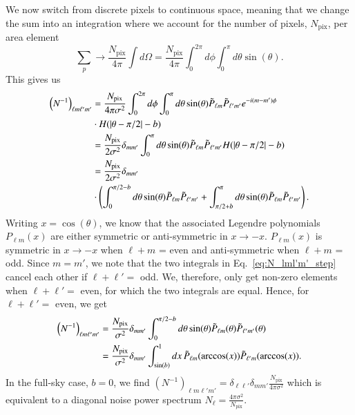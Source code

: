 \documentclass[twocolumn]{../common/aa}
\begin{document}
We now switch from discrete pixels to continuous space, meaning that we change the sum into an integration where we account for the number of pixels, $N_{\mathrm{pix}}$, per area element
\begin{equation}
\sum_p \rightarrow \frac{N_{\mathrm{pix}}}{4\pi}\int d\Omega  = \frac{N_{\mathrm{pix}}}{4\pi}\int_{0}^{2\pi} d\phi \int_{0}^{\pi} d\theta \sin(\theta).
\end{equation}
This gives us
\begin{align}
\nonumber
\left(N^{-1}\right)_{\ell m \ell' m'} &= \frac{N_{\mathrm{pix}}}{4\pi \sigma^2}\int_{0}^{2\pi} d\phi \int_{0}^{\pi} d\theta \sin(\theta)\Tilde{P}_{\ell m}  \Tilde{P}_{\ell' m'}  e^{-i(m-m')\phi}
\\
\nonumber
&\cdot H(|\theta -\pi/2|-b)\\
\nonumber
&= \frac{N_{\mathrm{pix}}}{2\sigma^2} \delta_{mm'}\int_{0}^{\pi} d\theta \sin(\theta)\Tilde{P}_{\ell m}  \Tilde{P}_{\ell' m'} H(|\theta -\pi/2|-b)\\
\nonumber
&= \frac{N_{\mathrm{pix}}}{2\sigma^2} \delta_{mm'}\\
\label{eq:N_lml'm'_step}
&\cdot \left(\int_{0}^{\pi/2-b} d\theta \sin(\theta) \Tilde{P}_{\ell m}  \Tilde{P}_{\ell' m'}+\int_{\pi/2+b}^{\pi} d\theta \sin(\theta)\Tilde{P}_{\ell m}  \Tilde{P}_{\ell' m'}\right).
\end{align}
Writing $x=\cos(\theta)$, we know that the associated Legendre polynomials $P_{\ell m}(x)$ are either symmetric or anti-symmetric in $x\rightarrow-x$. $P_{\ell m}(x)$ is symmetric in $x \rightarrow -x$ when $\ell+m$ = even and anti-symmetric when $\ell+m$ = odd. Since $m=m'$, we note that the two integrals in Eq.~\eqref{eq:N_lml'm'_step} cancel each other if $\ell+\ell' =$ odd. We, therefore, only get non-zero elements when $\ell + \ell' =$ even, for which the two integrals are equal. Hence, for $\ell + \ell'=$ even, we get
\begin{align}
\nonumber
\left(N^{-1}\right)_{\ell m \ell' m'} &= \frac{N_{\mathrm{pix}}}{\sigma^2} \delta_{mm'}\int_{0}^{\pi/2-b} d\theta \sin(\theta)\Tilde{P}_{\ell m}(\theta)\Tilde{P}_{\ell' m'}(\theta)\\
\label{eq:finished_n_inv}
&=\frac{N_{\mathrm{pix}}}{\sigma^2} \delta_{mm'}\int_{\sin(b)}^{1} dx \, \Tilde{P}_{\ell m}(\arccos(x)) \Tilde{P}_{\ell' m}(\arccos(x)).
\end{align}
In the full-sky case, $b=0$, we find $\left(N^{-1}\right)_{\ell m \ell' m'} = \delta_{\ell \ell'}\delta_{mm'}\frac{N_{\mathrm{pix}}}{4\pi \sigma^2}$ which is equivalent to a diagonal noise power spectrum ${N_{\ell} = \frac{4\pi\sigma^2}{N_{\mathrm{pix}}}}$.
\end{document}
